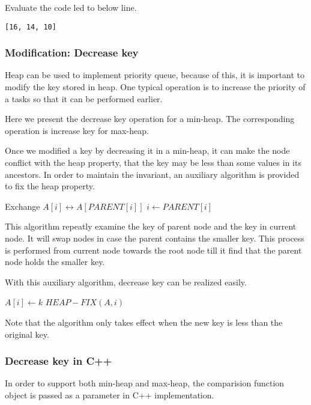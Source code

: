 \documentclass{article}
\begin{document}
Evaluate the code led to below line.

\begin{lstlisting}
[16, 14, 10]
\end{lstlisting}

\subsubsection{Modification: Decrease key}

Heap can be used to implement priority queue, because of this, it
is important to modify the key stored in heap. One typical operation
is to increase the priority of a tasks so that it can be performed
earlier.

Here we present the decrease key operation for a min-heap. The
corresponding operation is increase key for max-heap.

Once we modified a key by decreasing it in a min-heap, it can make
the node conflict with the heap property, that the key may be less
than some values in its ancestors. In order to maintain the
invariant, an auxiliary algorithm is provided to fix the heap
property.

\begin{algorithmic}[1]
    \State Exchange $A[i] \leftrightarrow A[PARENT[i]]$
    \State $i \gets PARENT[i]$
  \EndWhile
\EndFunction
\end{algorithmic}

This algorithm repeatly examine the key of parent node and
the key in current node. It will swap nodes in case the
parent contains the smaller key. This process is performed
from current node towards the root node till it find that
the parent node holds the smaller key.

With this auxiliary algorithm, decrease key can be realized
easily.

\begin{algorithmic}[1]
    \State $A[i] \gets k$
    \State $HEAP-FIX(A, i)$
  \EndIf
\EndFunction
\end{algorithmic}

Note that the algorithm only takes effect when the new key
is less than the original key.

\subsubsection*{Decrease key in C++}
In order to support both min-heap and max-heap, the comparision
function object is passed as a parameter in C++ implementation.
\end{document}
